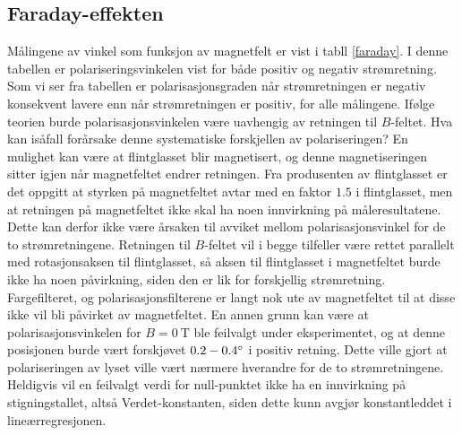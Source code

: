 \documentclass[%
 reprint,
 amsmath,amssymb,
 aps,
 norsk,
]{revtex4-1}
\begin{document}
\subsection{Faraday-effekten}
Målingene av vinkel som funksjon av magnetfelt er vist i tabll \vref{faraday}. I denne tabellen er polariseringsvinkelen vist for både positiv og negativ strømretning. Som vi ser fra tabellen er polarisasjonsgraden når strømretningen er negativ konsekvent lavere enn når strømretningen er positiv, for alle målingene. Ifølge teorien burde polarisasjonsvinkelen være uavhengig av retningen til $B$-feltet. Hva kan isåfall forårsake denne systematiske forskjellen av polariseringen? En mulighet kan være at flintglasset blir magnetisert, og denne magnetiseringen sitter igjen når magnetfeltet endrer retningen. Fra produsenten av flintglasset er det oppgitt at styrken på magnetfeltet avtar med en faktor $1.5$ i flintglasset, men at retningen på magnetfeltet ikke skal ha noen innvirkning på måleresultatene. Dette kan derfor ikke være årsaken til avviket mellom polarisasjonsvinkel for de to strømretningene. Retningen til $B$-feltet vil i begge tilfeller være rettet parallelt med rotasjonsaksen til flintglasset, så aksen til flintglasset i magnetfeltet burde ikke ha noen påvirkning, siden den er lik for forskjellig strømretning. Fargefilteret, og polarisasjonsfilterene er langt nok ute av magnetfeltet til at disse ikke vil bli påvirket av magnetfeltet. En annen grunn kan være at polarisasjonsvinkelen for $B=\SI{0}{\tesla}$ ble feilvalgt under eksperimentet, og at denne posisjonen burde vært forskjøvet $0.2-0.4\degree$ i positiv retning. Dette ville gjort at polariseringen av lyset ville vært nærmere hverandre for de to strømretningene. Heldigvis vil en feilvalgt verdi for null-punktet ikke ha en innvirkning på stigningstallet, altså Verdet-konstanten, siden dette kunn avgjør konstantleddet i lineærregresjonen.\\
\end{document}
